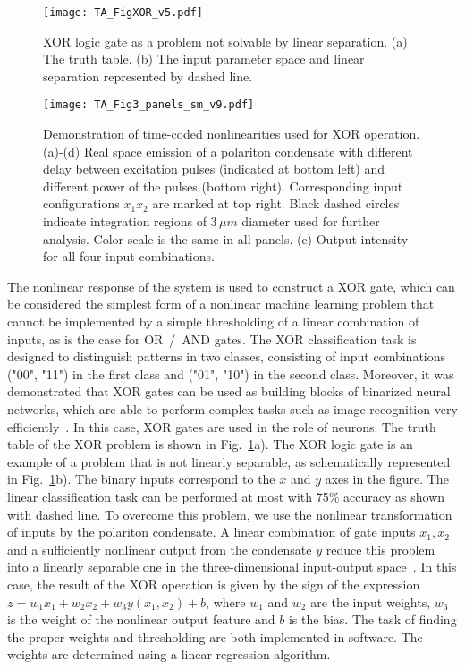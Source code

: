 \documentclass[
 print,
 amsmath,amssymb,
 aps,
]{revtex4-2}
\begin{document}
	\begin{figure}[t!]
		\centering
        \texttt{[image: TA\_FigXOR\_v5.pdf]}
		\caption{XOR logic gate as a problem not solvable by linear separation. (a) The truth table. (b) The input parameter space and linear separation represented by dashed line.}
		\label{fig:fig_XOR}
	\end{figure}
	\begin{figure}[b!]
		\centering
		\texttt{[image: TA\_Fig3\_panels\_sm\_v9.pdf]}
		\caption{Demonstration of time-coded nonlinearities used for XOR operation. (a)-(d) Real space emission of a polariton condensate with different delay between excitation pulses (indicated at bottom left) and different power of the pulses (bottom right). Corresponding input configurations $x_1x_2$ are marked at top right. Black dashed circles indicate integration regions of 3\,$\mu m$ diameter used for further analysis. Color scale is the same in all panels. (e) Output intensity for all four input combinations.}
		\label{im:XOR}
	\end{figure}
	The nonlinear response of the system is used to construct a XOR gate, which can be considered the simplest form of a nonlinear machine learning problem that cannot be implemented by a simple thresholding of a linear combination of inputs, as is the case for OR~/~AND gates. The XOR classification task is designed to distinguish patterns in two classes, consisting of input combinations ("00", "11") in the first class and ("01", "10") in the second class.  Moreover, it was demonstrated that XOR gates can be used as building blocks of binarized neural networks, which are able to perform complex tasks such as image recognition very efficiently~\cite{Bengio_Binarized,Rastegari}. In this case, XOR gates are used in the role of neurons. The truth table of the XOR problem is shown in Fig.~\ref{fig:fig_XOR}a). The XOR logic gate is an example of a problem that is not linearly separable, as schematically represented in Fig.~\ref{fig:fig_XOR}b). The binary inputs correspond to the $x$ and $y$ axes in the figure. The linear classification task can be performed at most with 75\% accuracy as shown with dashed line. To overcome this problem, we use the nonlinear transformation of inputs by the polariton condensate. A linear combination of gate inputs $x_1,x_2$ and a sufficiently nonlinear output from the condensate $y$ reduce this problem into a linearly separable one in the three-dimensional input-output space~\cite{Mirek_XOR}.
	In this case, the result of the XOR operation is given by the sign of the expression $z=w_1 x_1 + w_2 x_2 + w_3 y(x_1,x_2) + b$, where $w_1$ and $w_2$ are the input weights, $w_3$ is the weight of the nonlinear output feature and $b$ is the bias. 
	The task of finding the proper weights and thresholding are both implemented in software. The weights are determined using a linear regression algorithm. 
	
\end{document}
